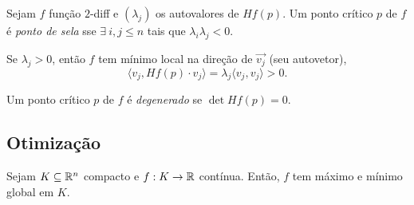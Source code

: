 \begin{definition}
    Sejam \(f\) função \(2\)-diff e \((\lambda_j)\) os autovalores de \(Hf(p)\). Um ponto crítico \(p\) de \(f\) é \emph{ponto de sela} sse \(\exists \ i,j\leq n\) tais que \(\lambda_i\lambda_j <0\). 
\end{definition}
\begin{note}
    Se \(\lambda_j > 0 \), então \(f\) tem mínimo local na direção de \(\vec{v_j}\) (seu autovetor), 
    \[\langle v_j, Hf(p)\cdot v_j\rangle = \lambda_j \langle v_j, v_j\rangle > 0.\]   
\end{note}
\vspace{-0.5cm}
\begin{definition}
   Um ponto crítico \(p\) de \(f\) é \emph{degenerado} se \(\det Hf(p) =0\).  
\end{definition}

\subsection*{Otimização}

\begin{theorem}
    Sejam \(K\subseteq \mathbb{R}^n\) compacto e \(f:K\to \mathbb{R}\) contínua. Então, \(f\) tem máximo e mínimo global em \(K\). 
\end{theorem}
%     

